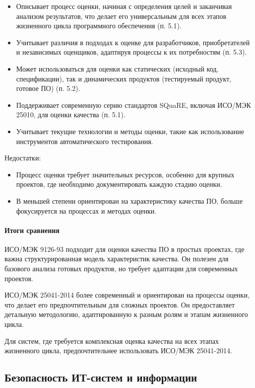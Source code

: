 \begin{itemize}
	\item Описывает процесс оценки, начиная с определения целей
		и заканчивая анализом результатов, что делает его универсальным
		для всех этапов жизненного цикла программного обеспечения (п. 5.1).
	\item Учитывает различия в подходах к оценке для разработчиков,
		приобретателей и независимых оценщиков,
		адаптируя процессы к их потребностям (п. 5.3).
	\item Может использоваться для оценки как статических
		(исходный код, спецификации),
		так и динамических продуктов
		(тестируемый продукт, готовое ПО) (п. 5.2).
	\item Поддерживает современную серию стандартов SQuaRE,
		включая ИСО/МЭК 25010, для оценки качества (п. 5.1).
	\item Учитывает текущие технологии и методы оценки,
		такие как использование инструментов автоматического тестирования.
\end{itemize}

Недостатки:

\begin{itemize}
	\item Процесс оценки требует значительных ресурсов,
		особенно для крупных проектов,
		где необходимо документировать каждую стадию оценки.
	\item В меньшей степени ориентирован на характеристику качества ПО,
		больше фокусируется на процессах и методах оценки.
\end{itemize}

\paragraph{Итоги сравнения}

ИСО/МЭК 9126-93 подходит для оценки качества ПО в простых проектах,
где важна структурированная модель характеристик качества.
Он полезен для базового анализа готовых продуктов,
но требует адаптации для современных проектов.

ИСО/МЭК 25041-2014 более современный и ориентирован на процессы оценки,
что делает его предпочтительным для сложных проектов.
Он предоставляет детальную методологию,
адаптированную к разным ролям и этапам жизненного цикла.

Для систем,
где требуется комплексная оценка качества на всех этапах жизненного цикла,
предпочтительнее использовать ИСО/МЭК 25041-2014.

\subsection{Безопасность ИТ-систем и информации}

